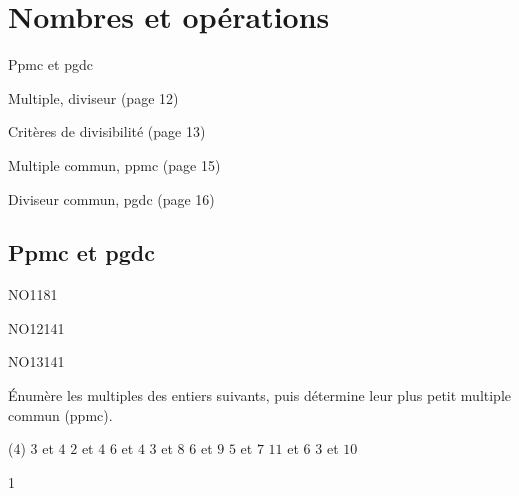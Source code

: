 \documentclass[a4paper,11pt]{report}
\begin{document}
\newcommand{\chapterName}{Nombres et opérations}
\newcommand{\serieName}{Ppmc et pgdc}

\chapter*{\chapterName}
\thispagestyle{empty}

\begin{amL}{\serieName}{
\item Multiple, diviseur (page 12)
\item Critères de divisibilité (page 13)
\item Multiple commun, ppmc (page 15)
\item Diviseur commun, pgdc (page 16)
}\end{amL}

\section*{\serieName}
\setcounter{page}{1}


\begin{QSJ}{7}{1}
\end{QSJ}

\begin{exof}{NO11}{8}{1}
\end{exof}

\begin{exol}{NO12}{14}{1}
\end{exol}

\begin{exol}{NO13}{14}{1}
\end{exol}


\begin{exo}{
    Énumère les multiples des entiers suivants, puis détermine leur plus petit multiple commun (ppmc).
\begin{tasks}(4)
    \task $3$ et $4$
    \task $2$ et $4$
    \task $6$ et $4$
    \task $3$ et $8$
    \task $6$ et $9$
    \task $5$ et $7$
    \task $11$ et $6$
    \task $3$ et $10$
\end{tasks}
}{1}\end{exo}
\end{document}
